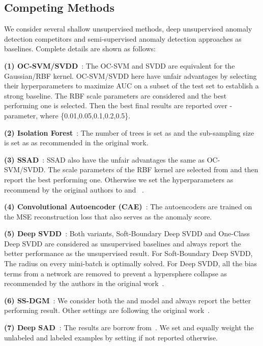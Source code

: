 \documentclass{bmvc2k}
\begin{document}
\subsection{Competing Methods}
We consider several shallow unsupervised methods, deep unsupervised anomaly detection competitors and semi-supervised anomaly detection approaches as baselines. Complete details are shown as follows:

\noindent \textbf{(1) OC-SVM/SVDD}~\cite{scholkopf2001estimating,tax2004support}: The OC-SVM and SVDD are equivalent for the Gaussian/RBF kernel. OC-SVM/SVDD here have unfair advantages by selecting their hyperparameters to maximize AUC on a subset  of the test set to establish a strong baseline. The RBF scale parameters  are considered and the best performing one is selected. Then the best final results are reported over -parameter, where  \{0.01,0.05,0.1,0.2,0.5\}.

\noindent \textbf{(2) Isolation Forest}~\cite{liu2008isolation}: The number of trees is set as  and the sub-sampling size is set as  as recommended in the original work.

\noindent \textbf{(3) SSAD}~\cite{gornitz2013toward}: SSAD also have the unfair advantages the same as OC-SVM/SVDD. The scale parameters  of the RBF kernel are selected from  and then report the best performing one. Otherwise we set the hyperparameters as recommend by the original authors to  and ~\cite{gornitz2013toward}.

\noindent \textbf{(4) Convolutional Autoencoder (CAE)}~\cite{masci2011stacked}: The autoencoders are trained on the MSE reconstruction loss that also serves as the anomaly score.

\noindent \textbf{(5) Deep SVDD}~\cite{ruff2018deep}: Both variants, Soft-Boundary Deep SVDD and One-Class Deep SVDD are considered as unsupervised baselines and always report the better performance as the unsupervised result. For Soft-Boundary Deep SVDD, The radius  on every mini-batch is optimally solved. For Deep SVDD, all the bias terms from a network are removed to prevent a hypersphere collapse as recommended by the authors in the original work~\cite{ruff2018deep}.

\noindent \textbf{(6) SS-DGM}~\cite{kingma2014semi}: We consider both the  and  model and always report the better performing result. Other settings are following the original work~\cite{kingma2014semi}.

\noindent \textbf{(7) Deep SAD~\cite{SAD}}: The results are borrow from~\cite{SAD}. We set  and equally weight the unlabeled and labeled examples by setting  if not reported otherwise.
\end{document}
